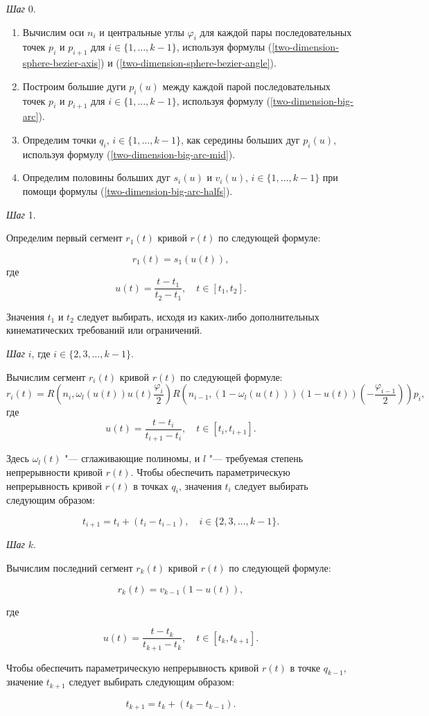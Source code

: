 \bigskip
\textit{Шаг} 0.

\begin{enumerate}
\item Вычислим оси $n_i$ и центральные углы $\varphi_i$ для каждой пары последовательных точек $p_i$ и $p_{i+1}$ для
$i \in \{1,\dots,k-1\}$, используя формулы (\ref{two-dimension-sphere-bezier-axis}) и
(\ref{two-dimension-sphere-bezier-angle}).
\item Построим большие дуги $p_i(u)$ между каждой парой последовательных точек $p_i$ и $p_{i+1}$ для
$i \in \{1,\dots,k-1\}$, используя формулу (\ref{two-dimension-big-arc}).
\item Определим точки $q_i$, $i \in \{1,\dots,k-1\}$, как середины больших дуг $p_i(u)$, используя формулу
(\ref{two-dimension-big-arc-mid}).
\item Определим половины больших дуг $s_i(u)$ и $v_i(u)$, $i \in \{1,\dots,k-1\}$ при помощи формулы
(\ref{two-dimension-big-arc-halfs}).
\end{enumerate}

\bigskip
\textit{Шаг} 1.

Определим первый сегмент $r_1(t)$ кривой $r(t)$ по следующей формуле:

$$
r_1(t)=s_1(u(t)),
$$
\noindent где
$$
u(t)=\frac{t-t_1}{t_2-t_1}, \quad t \in [t_1,t_2].
$$

Значения $t_1$ и $t_2$ следует выбирать, исходя из каких-либо дополнительных кинематических требований или ограничений.

\bigskip
\textit{Шаг} $i$, где $i \in \{2,3,\dots,k-1\}$.

Вычислим сегмент $r_i(t)$ кривой $r(t)$ по следующей формуле:
$$
r_i(t)=R(n_i,\omega_l(u(t))u(t)\frac{\varphi_i}{2})R(n_{i-1},(1-\omega_l(u(t)))(1-u(t))(-\frac{\varphi_{i-1}}{2}))p_i,
$$
\noindent где
$$
u(t)=\frac{t-t_i}{t_{i+1}-t_i}, \quad t \in [t_i,t_{i+1}].
$$

Здесь $\omega_l(t)$ "--- сглаживающие полиномы, и $l$ "--- требуемая степень непрерывности кривой $r(t)$. Чтобы обеспечить
параметрическую непрерывность кривой $r(t)$ в точках $q_i$, значения $t_i$ следует выбирать следующим образом:

$$
t_{i+1}=t_i+(t_i-t_{i-1}), \quad i \in \{2,3,\dots,k-1\}.
$$

\bigskip
\textit{Шаг} $k$.

Вычислим последний сегмент $r_k(t)$ кривой $r(t)$ по следующей формуле:

$$
r_k(t)=v_{k-1}(1-u(t)),
$$

\noindent где

$$
u(t)=\frac{t-t_k}{t_{k+1}-t_k}, \quad t \in [t_k,t_{k+1}].
$$

Чтобы обеспечить параметрическую непрерывность кривой $r(t)$ в точке $q_{k-1}$, значение $t_{k+1}$ следует выбирать
следующим образом:

$$
t_{k+1}=t_k+(t_k-t_{k-1}).
$$
